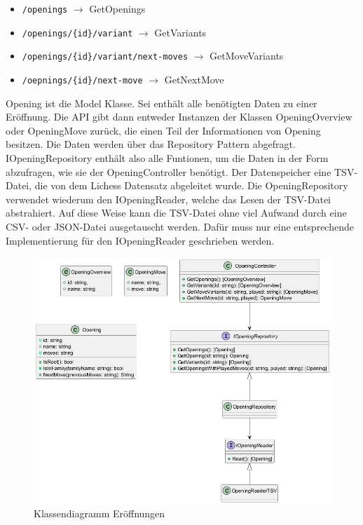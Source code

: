 \begin{itemize}
  \item \lstinline|/openings| $\rightarrow$ GetOpenings
  \item \lstinline|/openings/{id}/variant| $\rightarrow$ GetVariants
  \item \lstinline|/openings/{id}/variant/next-moves| $\rightarrow$ GetMoveVariants
  \item \lstinline|/oepnings/{id}/next-move| $\rightarrow$ GetNextMove
\end{itemize}

Opening ist die Model Klasse. Sei enthält alle benötigten Daten zu einer Eröffnung. Die API gibt dann entweder Instanzen der Klassen OpeningOverview oder OpeningMove zurück, die einen Teil der Informationen von Opening besitzen. Die Daten werden über das Repository Pattern abgefragt. IOpeningRepository enthält also alle Funtionen, um die Daten in der Form abzufragen, wie sie der OpeningController benötigt. Der Datenspeicher eine TSV-Datei, die von dem Lichess Datensatz abgeleitet wurde.   Die OpeningRepository verwendet wiederum den IOpeningReader, welche das Lesen der TSV-Datei abstrahiert. Auf diese Weise kann die TSV-Datei ohne viel Aufwand durch eine CSV- oder JSON-Datei ausgetauscht werden. Dafür muss nur eine entsprechende Implementierung für den IOpeningReader geschrieben werden.

\begin{figure}[h]
  \includegraphics[width=\linewidth]{images/diagrams/opening.png}
  \caption{Klassendiagramm Eröffnungen}
  \label{fig:cd_opening}
\end{figure}

